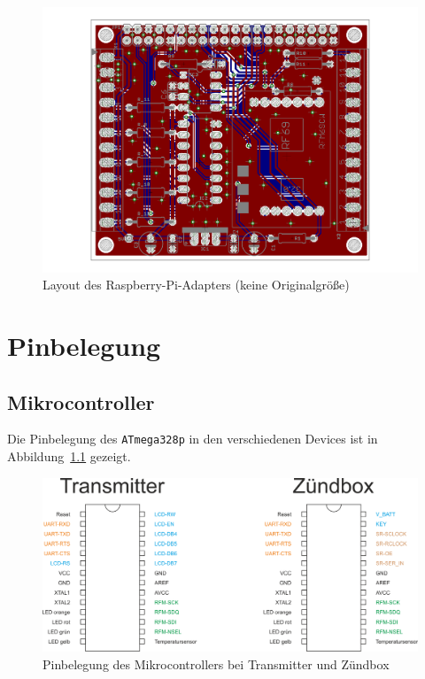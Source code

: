\documentclass[paper=a4, parskip, numbers=noenddot, toc=listof, headsepline]{scrbook}
\begin{document}
		 \begin{figure}
			 \centering
			 \includegraphics[angle=-90,width=.95\textwidth,keepaspectratio]{Bilder/Piadapterlayout}
			 \caption{Layout des Raspberry-Pi-Adapters (keine Originalgröße)}
			 \label{fig:piadapterlayout}
		 \end{figure}

		 \begin{refsection}
			 \newrefcontext[sorting=nty]
			 \nocite{*} %
			 \printbibliography[title=Datenblätter, heading=bibnumbered]
			 \label{sec:datasheets}
		 \end{refsection}

		\chapter{Pinbelegung}
		 \label{ch:pinbelegung}

		 \section{Mikrocontroller}
		  Die Pinbelegung des \texttt{ATmega328p} in den verschiedenen Devices ist in Abbildung~\ref{fig:pinout} gezeigt.

		  \begin{figure}
			  \centering
			  \includegraphics[width=.7\textwidth]{Bilder/pinout}
			  \caption{Pinbelegung des Mikrocontrollers bei Transmitter und Zündbox}
			  \label{fig:pinout}
		  \end{figure}
\end{document}
